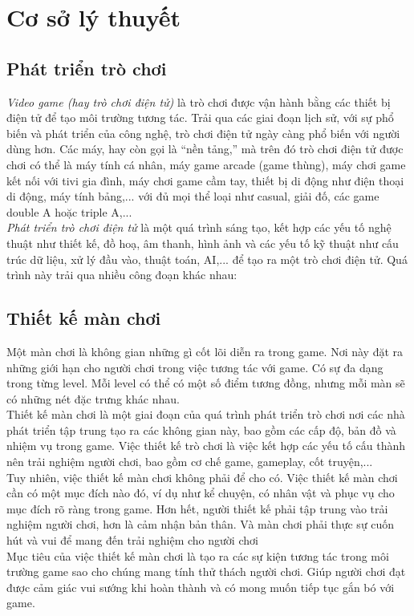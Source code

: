 \section{Cơ sở lý thuyết}
\subsection{Phát triển trò chơi}
\hspace*{0.5cm} \textit{Video game (hay trò chơi điện tử)} là trò chơi được vận hành bằng các thiết bị điện tử để tạo môi trường tương tác. Trải qua các giai đoạn lịch sử, với sự phổ biến và phát triển của công nghệ, trò chơi điện tử ngày càng phổ biến với người dùng hơn. Các máy, hay còn gọi là “nền tảng,” mà trên đó trò chơi điện tử được chơi có thể là máy tính cá nhân, máy game arcade (game thùng), máy chơi game kết nối với tivi gia đình, máy chơi game cầm tay, thiết bị di động như điện thoại di động, máy tính bảng,... với đủ mọi thể loại như casual, giải đố, các game double A hoặc triple A,...\\
\hspace*{0.5cm} \textit{Phát triển trò chơi điện tử} là một  quá trình sáng tạo, kết hợp các yếu tố nghệ thuật như thiết kế, đồ hoạ, âm thanh, hình ảnh và các yếu tố kỹ thuật như cấu trúc dữ liệu, xử lý đầu vào, thuật toán, AI,... để tạo ra một trò chơi điện tử. Quá trình này trải qua nhiều công đoạn khác nhau:\\
\subsection{Thiết kế màn chơi}
\hspace*{0.5cm} Một màn chơi là không gian những gì cốt lõi diễn ra trong game. Nơi này đặt ra những giới hạn cho người chơi trong việc tương tác với game. Có sự đa dạng trong từng level. Mỗi level có thể có một số điểm tương đồng, nhưng mỗi màn sẽ có những nét đặc trưng khác nhau.\\
\hspace*{0.5cm} Thiết kế màn chơi là một giai đoạn của quá trình phát triển trò chơi nơi các nhà phát triển tập trung tạo ra các không gian này, bao gồm các cấp độ, bản đồ và nhiệm vụ trong game. Việc thiết kế trò chơi là việc kết hợp các yếu tố cấu thành nên trải nghiệm người chơi, bao gồm cơ chế game, gameplay, cốt truyện,...\\
\hspace*{0.5cm} Tuy nhiên, việc thiết kế màn chơi không phải để cho có. Việc thiết kế màn chơi cần có một mục đích nào đó, ví dụ như kể chuyện, có nhân vật và phục vụ cho mục đích rõ ràng trong game. Hơn hết, người thiết kế phải tập trung vào trải nghiệm người chơi, hơn là cảm nhận bản thân. Và màn chơi phải thực sự cuốn hút và vui để mang đến trải nghiệm cho người chơi\\
\hspace*{0.5cm} Mục tiêu của việc thiết kế màn chơi là tạo ra các sự kiện tương tác trong môi trường game sao cho chúng mang tính thử thách người chơi. Giúp người chơi đạt được cảm giác vui sướng khi hoàn thành và có mong muốn tiếp tục gắn bó với game.\\
